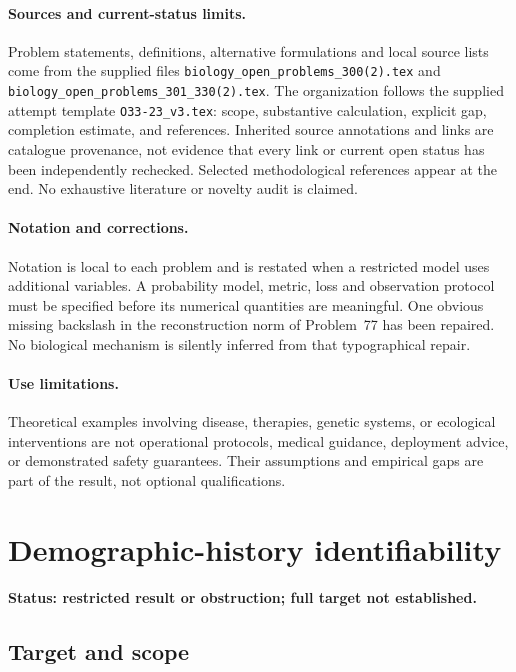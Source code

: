 \documentclass[11pt]{article}
\begin{document}
\paragraph{Sources and current-status limits.}
Problem statements, definitions, alternative formulations and local source lists
come from the supplied files
\texttt{biology\_open\_problems\_300(2).tex} and
\texttt{biology\_open\_problems\_301\_330(2).tex}.
The organization follows the supplied attempt template
\texttt{O33-23\_v3.tex}: scope, substantive calculation, explicit gap,
completion estimate, and references. Inherited source annotations and links are
catalogue provenance, not evidence that every link or current open status has
been independently rechecked. Selected methodological references appear at the
end. No exhaustive literature or novelty audit is claimed.

\paragraph{Notation and corrections.}
Notation is local to each problem and is restated when a restricted model uses
additional variables. A probability model, metric, loss and observation protocol
must be specified before its numerical quantities are meaningful. One obvious
missing backslash in the reconstruction norm of Problem~77 has been repaired.
No biological mechanism is silently inferred from that typographical repair.

\paragraph{Use limitations.}
Theoretical examples involving disease, therapies, genetic systems, or ecological
interventions are not operational protocols, medical guidance, deployment advice,
or demonstrated safety guarantees. Their assumptions and empirical gaps are part
of the result, not optional qualifications.


\section*{Demographic-history identifiability}
\label{prob:162}
\noindent\textbf{Status: restricted result or obstruction; full target not established.}
\subsection{Target and scope}
\end{document}
